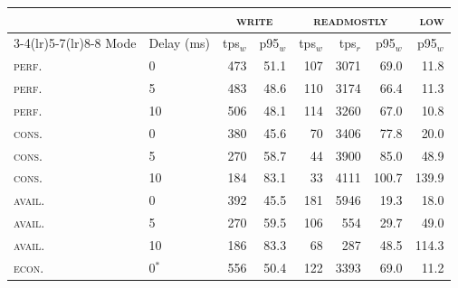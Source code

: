 \begin{tabular}{llrrrrrr}
\toprule
 & & \multicolumn{2}{c}{\textsc{write}} & \multicolumn{3}{c}{\textsc{readmostly}} & \textsc{low} \\
\cmidrule(lr){3-4}\cmidrule(lr){5-7}\cmidrule(lr){8-8}
Mode & Delay (ms) & tps$_w$ & p95$_w$ & tps$_w$ & tps$_r$ & p95$_w$ & p95$_w$ \\
\midrule
\textsc{perf.} & 0 & 473 & 51.1 & 107 & 3071 & 69.0 & 11.8 \\
\textsc{perf.} & 5 & 483 & 48.6 & 110 & 3174 & 66.4 & 11.3 \\
\textsc{perf.} & 10 & 506 & 48.1 & 114 & 3260 & 67.0 & 10.8 \\
\addlinespace
\textsc{cons.} & 0 & 380 & 45.6 & 70 & 3406 & 77.8 & 20.0 \\
\textsc{cons.} & 5 & 270 & 58.7 & 44 & 3900 & 85.0 & 48.9 \\
\textsc{cons.} & 10 & 184 & 83.1 & 33 & 4111 & 100.7 & 139.9 \\
\addlinespace
\textsc{avail.} & 0 & 392 & 45.5 & 181 & 5946 & 19.3 & 18.0 \\
\textsc{avail.} & 5 & 270 & 59.5 & 106 & 554 & 29.7 & 49.0 \\
\textsc{avail.} & 10 & 186 & 83.3 & 68 & 287 & 48.5 & 114.3 \\
\addlinespace
\textsc{econ.} & 0$^{*}$ & 556 & 50.4 & 122 & 3393 & 69.0 & 11.2 \\
\bottomrule
\end{tabular}
